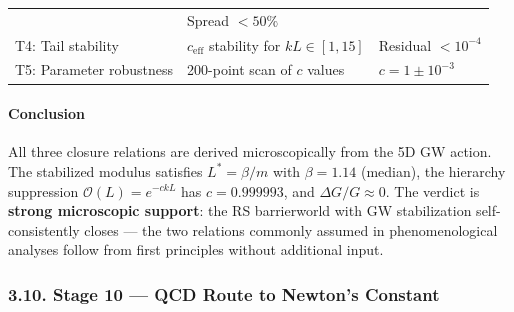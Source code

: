 \documentclass[
  11pt,
]{article}
\begin{document}
\begin{longtable}[]{@{}lll@{}}
\begin{minipage}[t]{0.30\columnwidth}
\end{minipage} & \begin{minipage}[t]{0.30\columnwidth}\raggedright
Spread \(< 50\%\)\strut
\end{minipage}\tabularnewline
\begin{minipage}[t]{0.30\columnwidth}\raggedright
T4: Tail stability\strut
\end{minipage} & \begin{minipage}[t]{0.30\columnwidth}\raggedright
\(c_\text{eff}\) stability for \(kL \in [1, 15]\)\strut
\end{minipage} & \begin{minipage}[t]{0.30\columnwidth}\raggedright
Residual \(< 10^{-4}\)\strut
\end{minipage}\tabularnewline
\begin{minipage}[t]{0.30\columnwidth}\raggedright
T5: Parameter robustness\strut
\end{minipage} & \begin{minipage}[t]{0.30\columnwidth}\raggedright
200-point scan of \(c\) values\strut
\end{minipage} & \begin{minipage}[t]{0.30\columnwidth}\raggedright
\(c = 1 \pm 10^{-3}\)\strut
\end{minipage}\tabularnewline
\bottomrule
\end{longtable}

\bigskip

\hypertarget{conclusion}{%
\paragraph{Conclusion}\label{conclusion}}

All three closure relations are derived microscopically from the 5D GW
action. The stabilized modulus satisfies \(L^* = \beta/m\) with
\(\beta = 1.14\) (median), the hierarchy suppression
\(\mathcal{O}(L) = e^{-ckL}\) has \(c = 0.999993\), and
\(\Delta G/G \approx 0\). The verdict is \textbf{strong microscopic
support}: the RS barrierworld with GW stabilization self-consistently
closes --- the two relations commonly assumed in phenomenological
analyses follow from first principles without additional input.

\hypertarget{stage-10-qcd-route-to-newtons-constant}{%
\subsubsection{3.10. Stage 10 --- QCD Route to Newton's
Constant}\label{stage-10-qcd-route-to-newtons-constant}}
\end{document}
